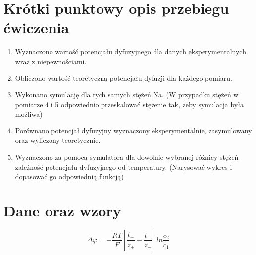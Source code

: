 \documentclass{article}
\begin{document}
    
\section{Krótki punktowy opis przebiegu ćwiczenia}
    \begin{enumerate}[label=(\alph*)]
        \item Wyznaczono wartość potencjału dyfuzyjnego dla danych eksperymentalnych wraz z niepewnościami.\newline
        \item Obliczono wartość teoretyczną potencjału dyfuzji dla każdego pomiaru. \newline
        \item Wykonano symulację dla tych samych stężeń Na. (W przypadku stężeń w pomiarze 4 i 5 odpowiednio przeskalować stężenie tak, żeby symulacja była możliwa)\newline
        \item Porównano potencjał dyfuzyjny wyznaczony eksperymentalnie, zasymulowany oraz wyliczony teoretycznie.  \newline
        \item Wyznaczono za pomocą symulatora dla dowolnie wybranej różnicy stężeń zależność potencjału dyfuzyjnego od temperatury. (Narysować wykres i dopasować go odpowiednią funkcją)\newline
    \end{enumerate}

\section{Dane oraz wzory}
    \begin{table}[!h]
        \centering
        \caption{Dane ćwiczeniowe}
        \label{tab:tab1}
    \end{table}
    
    \begin{table}[!h]
        \centering
        \caption{Przedłużenie tabeli \ref{tab:tab1}}
        \label{tab:tab2}
    \end{table}
    
\FloatBarrier
    \begin{equation}
        \Delta\varphi=-\frac{RT}{F}\left[\frac{t_+}{z_+}-\frac{t_-}{z_-}\right]ln\frac{c_2}{c_1}
        \label{eq:henderson}
    \end{equation}
\end{document}
